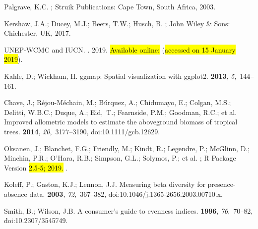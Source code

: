 \documentclass[diversity,article,accept,moreauthors,pdftex]{Definitions/mdpi}
\begin{document}
\begin{thebibliography}{999}
Palgrave, K.C.
; Struik Publications: Cape Town,
  South Africa,  2003.

Kershaw, J.A.; Ducey, M.J.; Beers, T.W.; Husch, B.
; John Wiley \& Sons: Chichester, UK,  2017.

{UNEP-WCMC and IUCN}.
.
   2019. \hl{Available online:} %
(\hl{accessed on 15 January 2019}). %

Kahle, D.; Wickham, H.
\newblock ggmap: {Spatial} visualization with ggplot2.
 {\bf 2013}, {\em 5},~144--161.

Chave, J.; R{\'{e}}jou-M{\'{e}}chain, M.; B{\'{u}}rquez, A.; Chidumayo, E.;
  Colgan, M.S.; Delitti, W.B.C.; Duque, A.; Eid,~T.; Fearnside, P.M.; Goodman,
  R.C.; et al.
\newblock Improved allometric models to estimate the aboveground biomass of
  tropical trees.
 {\bf 2014}, {\em 20},~3177--3190, doi:10.1111/gcb.12629.

Oksanen, J.; Blanchet, F.G.; Friendly, M.; Kindt, R.; Legendre, P.; {McGlinn},
  D.; Minchin, P.R.; O'Hara, R.B.; Simpson, G.L.; Solymos, P.; et al.
; R Package Version \hl{2.5-5;  2019.} %
\newblock .

Koleff, P.; Gaston, K.J.; Lennon, J.J.
\newblock Measuring beta diversity for presence-absence data.
 {\bf 2003}, {\em 72},~367--382, doi:10.1046/j.1365-2656.2003.00710.x.

Smith, B.; Wilson, J.B.
\newblock A consumer's guide to evenness indices.
 {\bf 1996}, {\em 76},~70--82, doi:10.2307/3545749.


\end{thebibliography}
\end{document}
